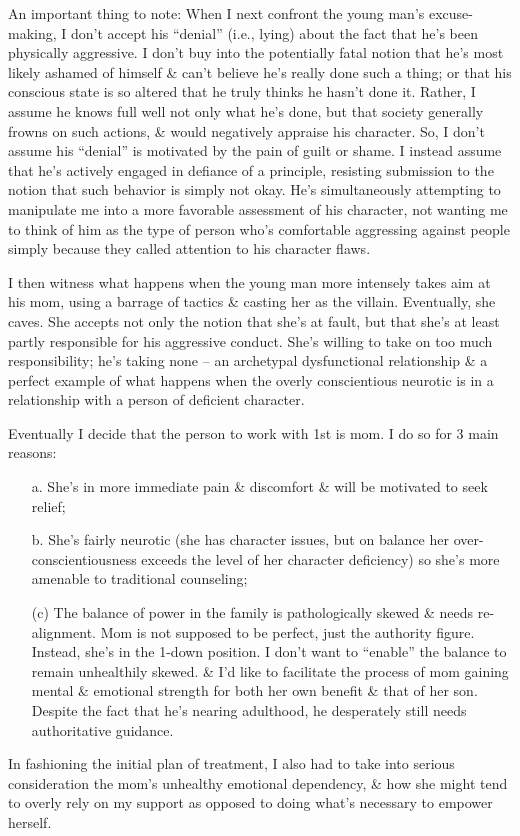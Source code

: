 \documentclass{article}
\numberwithin{equation}{section}
\begin{document}
An important thing to note: When I next confront the young man's excuse-making, I don't accept his ``denial'' (i.e., lying) about the fact that he's been physically aggressive. I don't buy into the potentially fatal notion that he's most likely ashamed of himself \& can't believe he's really done such a thing; or that his conscious state is so altered that he truly thinks he hasn't done it. Rather, I assume he knows full well not only what he's done, but that society generally frowns on such actions, \& would negatively appraise his character. So, I don't assume his ``denial'' is motivated by the pain of guilt or shame. I instead assume that he's actively engaged in defiance of a principle, resisting submission to the notion that such behavior is simply not okay. He's simultaneously attempting to manipulate me into a more favorable assessment of his character, not wanting me to think of him as the type of person who's comfortable aggressing against people simply because they called attention to his character flaws.

I then witness what happens when the young man more intensely takes aim at his mom, using a barrage of tactics \& casting her as the villain. Eventually, she caves. She accepts not only the notion that she's at fault, but that she's at least partly responsible for his aggressive conduct. She's willing to take on too much responsibility; he's taking none -- an archetypal dysfunctional relationship \& a perfect example of what happens when the overly conscientious neurotic is in a relationship with a person of deficient character.

Eventually I decide that the person to work with 1st is mom. I do so for 3 main reasons:
\begin{itemize}
	\item[a.] She's in more immediate pain \& discomfort \& will be motivated to seek relief;
	\item[b.] She's fairly neurotic (she has character issues, but on balance her over-conscientiousness exceeds the level of her character deficiency) so she's more amenable to traditional counseling;
	\item[(c)] The balance of power in the family is pathologically skewed \& needs re-alignment. Mom is not supposed to be perfect, just the authority figure. Instead, she's in the 1-down position. I don't want to ``enable'' the balance to remain unhealthily skewed. \& I'd like to facilitate the process of mom gaining mental \& emotional strength for both her own benefit \& that of her son. Despite the fact that he's nearing adulthood, he desperately still needs authoritative guidance.
\end{itemize}
In fashioning the initial plan of treatment, I also had to take into serious consideration the mom's unhealthy emotional dependency, \& how she might tend to overly rely on my support as opposed to doing what's necessary to empower herself.
\end{document}
